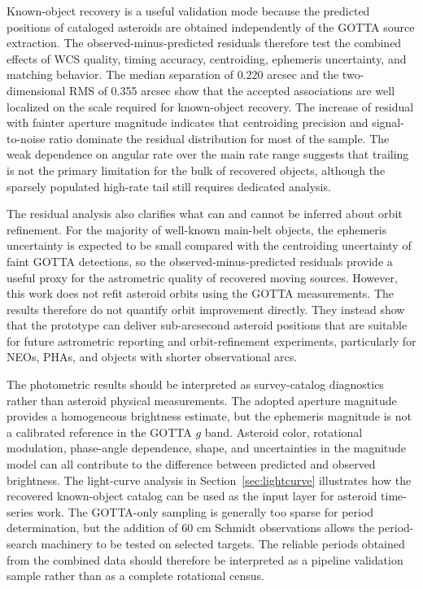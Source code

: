 \documentclass[referee]{raa}
\begin{document}
Known-object recovery is a useful validation mode because the predicted positions of cataloged asteroids are obtained independently of the GOTTA source extraction. The observed-minus-predicted residuals therefore test the combined effects of WCS quality, timing accuracy, centroiding, ephemeris uncertainty, and matching behavior. The median separation of 0.220 arcsec and the two-dimensional RMS of 0.355 arcsec show that the accepted associations are well localized on the scale required for known-object recovery. The increase of residual with fainter aperture magnitude indicates that centroiding precision and signal-to-noise ratio dominate the residual distribution for most of the sample. The weak dependence on angular rate over the main rate range suggests that trailing is not the primary limitation for the bulk of recovered objects, although the sparsely populated high-rate tail still requires dedicated analysis.

The residual analysis also clarifies what can and cannot be inferred about orbit refinement. For the majority of well-known main-belt objects, the ephemeris uncertainty is expected to be small compared with the centroiding uncertainty of faint GOTTA detections, so the observed-minus-predicted residuals provide a useful proxy for the astrometric quality of recovered moving sources. However, this work does not refit asteroid orbits using the GOTTA measurements. The results therefore do not quantify orbit improvement directly. They instead show that the prototype can deliver sub-arcsecond asteroid positions that are suitable for future astrometric reporting and orbit-refinement experiments, particularly for NEOs, PHAs, and objects with shorter observational arcs.

The photometric results should be interpreted as survey-catalog diagnostics rather than asteroid physical measurements. The adopted aperture magnitude provides a homogeneous brightness estimate, but the ephemeris magnitude is not a calibrated reference in the GOTTA $g$ band. Asteroid color, rotational modulation, phase-angle dependence, shape, and uncertainties in the magnitude model can all contribute to the difference between predicted and observed brightness. The light-curve analysis in Section~\ref{sec:lightcurve} illustrates how the recovered known-object catalog can be used as the input layer for asteroid time-series work. The GOTTA-only sampling is generally too sparse for period determination, but the addition of 60 cm Schmidt observations allows the period-search machinery to be tested on selected targets. The reliable periods obtained from the combined data should therefore be interpreted as a pipeline validation sample rather than as a complete rotational census.
\end{document}
